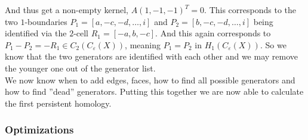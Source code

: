 \documentclass[11pt, a4paper, UKenglish]{article}
\begin{document}
    And thus get a non-empty kernel, $A(1,-1,-1)^T=0$.
    This corresponds to the two $1$-boundaries $P_1=[a,-c,-d,\ldots,i]$ and $P_2=[b,-c,-d,\ldots,i]$ being identified via the $2$-cell $R_1=[-a,b,-c]$.
    And this again corresponds to $P_1-P_2=-R_1\in C_2(C_\varepsilon(X))$, meaning $P_1 = P_2$ in $H_1(C_\varepsilon(X))$.
    So we know that the two generators are identified with each other and we may remove the younger one out of the generator list.\\
    We now know when to add edges, faces, how to find all possible generators and how to find ''dead'' generators.
    Putting this together we are now able to calculate the first persistent homology.

    \subsubsection{Optimizations}\label{subsec:optimizations}
\end{document}
